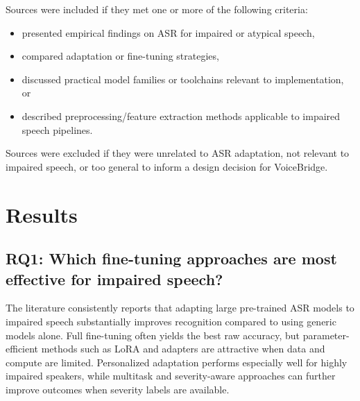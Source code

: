 \documentclass{article}
\begin{document}
Sources were included if they met one or more of the following criteria:
\begin{itemize}
    \item presented empirical findings on ASR for impaired or atypical speech,
    \item compared adaptation or fine-tuning strategies,
    \item discussed practical model families or toolchains relevant to implementation, or
    \item described preprocessing/feature extraction methods applicable to impaired speech pipelines.
\end{itemize}

Sources were excluded if they were unrelated to ASR adaptation, not relevant to impaired speech, or too general to inform a design decision for VoiceBridge.

\section{Results}

\subsection*{RQ1: Which fine-tuning approaches are most effective for impaired speech?}

The literature consistently reports that adapting large pre-trained ASR models to impaired speech substantially improves recognition compared to using generic models alone. Full fine-tuning often yields the best raw accuracy, but parameter-efficient methods such as LoRA and adapters are attractive when data and compute are limited. Personalized adaptation performs especially well for highly impaired speakers, while multitask and severity-aware approaches can further improve outcomes when severity labels are available.
\end{document}
